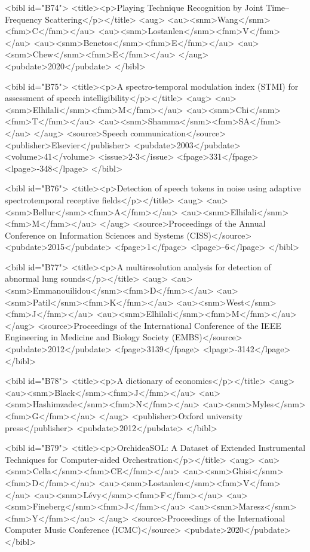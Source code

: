 \documentclass{bmcart}
\begin{document}
\begin{backmatter}
{<bibl id="B74">
  <title><p>Playing Technique Recognition by Joint Time--Frequency
  Scattering</p></title>
  <aug>
    <au><snm>Wang</snm><fnm>C</fnm></au>
    <au><snm>Lostanlen</snm><fnm>V</fnm></au>
    <au><snm>Benetos</snm><fnm>E</fnm></au>
    <au><snm>Chew</snm><fnm>E</fnm></au>
  </aug>
  <pubdate>2020</pubdate>
</bibl>

<bibl id="B75">
  <title><p>A spectro-temporal modulation index (STMI) for assessment of speech
  intelligibility</p></title>
  <aug>
    <au><snm>Elhilali</snm><fnm>M</fnm></au>
    <au><snm>Chi</snm><fnm>T</fnm></au>
    <au><snm>Shamma</snm><fnm>SA</fnm></au>
  </aug>
  <source>Speech communication</source>
  <publisher>Elsevier</publisher>
  <pubdate>2003</pubdate>
  <volume>41</volume>
  <issue>2-3</issue>
  <fpage>331</fpage>
  <lpage>-348</lpage>
</bibl>

<bibl id="B76">
  <title><p>Detection of speech tokens in noise using adaptive spectrotemporal
  receptive fields</p></title>
  <aug>
    <au><snm>Bellur</snm><fnm>A</fnm></au>
    <au><snm>Elhilali</snm><fnm>M</fnm></au>
  </aug>
  <source>Proceedings of the Annual Conference on Information Sciences and
  Systems (CISS)</source>
  <pubdate>2015</pubdate>
  <fpage>1</fpage>
  <lpage>-6</lpage>
</bibl>

<bibl id="B77">
  <title><p>A multiresolution analysis for detection of abnormal lung
  sounds</p></title>
  <aug>
    <au><snm>Emmanouilidou</snm><fnm>D</fnm></au>
    <au><snm>Patil</snm><fnm>K</fnm></au>
    <au><snm>West</snm><fnm>J</fnm></au>
    <au><snm>Elhilali</snm><fnm>M</fnm></au>
  </aug>
  <source>Proceedings of the International Conference of the IEEE Engineering
  in Medicine and Biology Society (EMBS)</source>
  <pubdate>2012</pubdate>
  <fpage>3139</fpage>
  <lpage>-3142</lpage>
</bibl>

<bibl id="B78">
  <title><p>A dictionary of economics</p></title>
  <aug>
    <au><snm>Black</snm><fnm>J</fnm></au>
    <au><snm>Hashimzade</snm><fnm>N</fnm></au>
    <au><snm>Myles</snm><fnm>G</fnm></au>
  </aug>
  <publisher>Oxford university press</publisher>
  <pubdate>2012</pubdate>
</bibl>

<bibl id="B79">
  <title><p>OrchideaSOL: A Dataset of Extended Instrumental Techniques for
  Computer-aided Orchestration</p></title>
  <aug>
    <au><snm>Cella</snm><fnm>CE</fnm></au>
    <au><snm>Ghisi</snm><fnm>D</fnm></au>
    <au><snm>Lostanlen</snm><fnm>V</fnm></au>
    <au><snm>L{\'e}vy</snm><fnm>F</fnm></au>
    <au><snm>Fineberg</snm><fnm>J</fnm></au>
    <au><snm>Maresz</snm><fnm>Y</fnm></au>
  </aug>
  <source>Proceedings of the International Computer Music Conference
  (ICMC)</source>
  <pubdate>2020</pubdate>
</bibl>

}
\end{backmatter}
\end{document}
